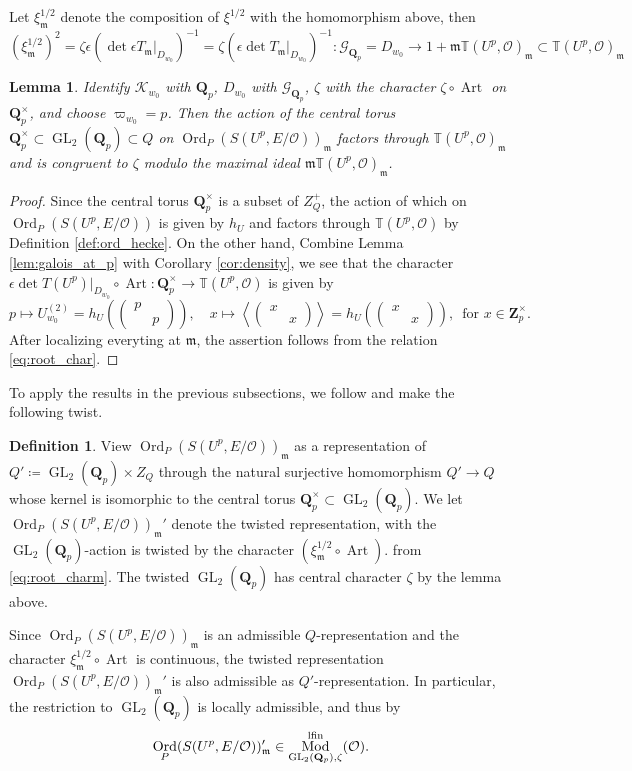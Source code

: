 \documentclass[leqno]{amsart}
\newtheorem{lem}[thm]{Lemma}
\theoremstyle{definition}
\newtheorem{defn}[thm]{Definition}
\theoremstyle{remark}
\newcommand{\smat}[1]{\left(\begin{smallmatrix} #1 \end{smallmatrix}\right)}
\newcommand{\oo}{\mathcal{O}}
\newcommand{\Qp}{\mathbf{Q}_p}
\newcommand{\Zp}{\mathbf{Z}_p}
\DeclareMathOperator{\GL}{GL}
\DeclareMathOperator{\Art}{Art}
\newcommand{\fm}{\mathfrak{m}}
\DeclareMathOperator{\Mod}{\textnormal{Mod}}
\DeclareMathOperator{\Ord}{Ord} %
\newcommand{\Gp}{\mathcal{G}_{\Qp}} %
\newcommand{\lfin}{\textnormal{lfin}}
\newcommand{\K}{{\mathcal{K}}} %
\newcommand{\TT}{\mathbb{T}} %
\begin{document}
Let $\xi_\fm^{1/2}$ denote the composition 
of $\xi^{1/2}$ with the homomorphism above, then
\begin{equation}\label{eq:root_charm}
	(\xi_\fm^{1/2})^2=
	\zeta\epsilon(\det \epsilon T_\fm\vert_{D_{w_0}})^{-1}
	=\zeta(\epsilon\det T_\fm\vert_{D_{w_0}})^{-1}\colon
	\Gp=D_{w_0}\to 1+\fm\TT(U^p,\oo)_\fm\subset \TT(U^p,\oo)_\fm
\end{equation}
\begin{lem}\label{lem:twist}
Identify 
$\K_{w_0}$ with $\Qp$,
$D_{w_0}$ with $\Gp$,
$\zeta$ with the character $\zeta\circ \Art$ on $\Qp^\times$,
and choose $\varpi_{w_0}=p$.
Then the action of the central torus
$\Qp^\times \subset \GL_2(\Qp)\subset Q$
on $\Ord_P(S(U^p,E/\oo))_{\fm}$
factors through $\TT(U^p,\oo)_{\fm}$ 
and is congruent to $\zeta$ modulo the maximal ideal
$\fm\TT(U^p,\oo)_{\fm}$.
\end{lem}
\begin{proof}

Since the central torus $\Qp^\times$
is a subset of $Z_Q^+$,
the action of which on
$\Ord_P(S(U^p,E/\oo))$ is given by $h_U$
and factors through $\TT(U^p,\oo)$ by Definition
\ref{def:ord_hecke}.
On the other hand,
Combine Lemma \ref{lem:galois_at_p}
with Corollary \ref{cor:density}, we see that 
the character 
$\epsilon\det T(U^p)\vert_{D_{w_0}}\circ \Art\colon
	\Qp^\times\to \TT(U^p,\oo)$ is given by
\[
	p\mapsto U_{w_0}^{(2)}=
    h_U\left(\smat{p&\\&p}\right),\quad
	x\mapsto \left\langle \smat{x&\\&x}\right\rangle=
    h_U\left(\smat{x&\\&x}\right),\,
	\text{ for }x\in\Zp^\times.
\]
After localizing everyting at $\fm$,
the assertion follows from 
the relation \eqref{eq:root_char}.
\end{proof}


To apply the results in the previous subsections,
we follow \cite{urban} and make the following twist.
\begin{defn}\label{def:twist}
View $\Ord_P(S(U^p,E/\oo))_{\fm}$
as a representation of
$Q'\coloneq \GL_2(\Qp)\times Z_Q$
through the natural surjective
homomorphism  $Q'\to Q$
whose kernel is isomorphic to the central torus
$\Qp^\times\subset \GL_2(\Qp)$.
We let $\Ord_P(S(U^p,E/\oo))_{\fm}'$
denote the twisted representation,
with the $\GL_2(\Qp)$-action is
twisted by the character
$(\xi_{\fm}^{1/2}\circ\Art)$.
from \eqref{eq:root_charm}.
The twisted $\GL_2(\Qp)$ has central character $\zeta$
by the lemma above.
\end{defn}
Since $\Ord_P(S(U^p,E/\oo))_{\fm}$
is an admissible $Q$-representation
and the character $\xi_{\fm}^{1/2}\circ \Art$
is continuous,
the twisted representation
$\Ord_P(S(U^p,E/\oo))_{\fm}'$ is also admissible
as $Q'$-representation.
In particular,
the restriction to $\GL_2(\Qp)$
is locally admissible, and thus by \cite[Thm 2.3.8]{emeI}
\[
    \Ord_P(S(U^p,E/\oo))_{\fm}'\in \Mod^{\lfin}_{\GL_2(\Qp),\zeta}(\oo).
\]
\end{document}
